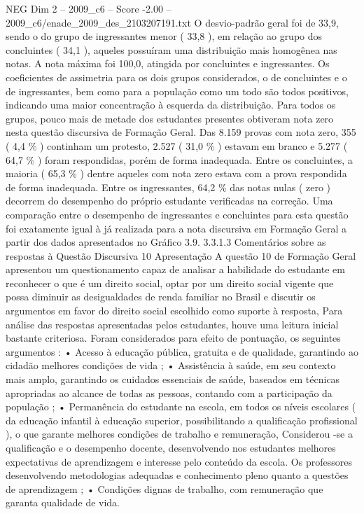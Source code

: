 \begin{textsample}{NEG Dim 2 – 2009\_c6 – Score -2.00 – 2009\_c6/enade\_2009\_des\_2103207191.txt}
O desvio-padrão geral foi de 33,9, sendo o do grupo de ingressantes menor ( 33,8 ), em relação ao grupo dos concluintes ( 34,1 ), aqueles possuíram uma distribuição mais homogênea nas notas.
A nota máxima foi 100,0, atingida por concluintes e ingressantes.
Os coeficientes de assimetria para os dois grupos considerados, o de concluintes e o de ingressantes, bem como para a população como um todo são todos positivos, indicando uma maior concentração à esquerda da distribuição.
Para todos os grupos, pouco mais de metade dos estudantes presentes obtiveram nota zero nesta questão discursiva de Formação Geral.
Das 8.159 provas com nota zero, 355 ( 4,4 \% ) continham um protesto, 2.527 ( 31,0 \% ) estavam em branco e 5.277 ( 64,7 \% ) foram respondidas, porém de forma inadequada.
Entre os concluintes, a maioria ( 65,3 \% ) dentre aqueles com nota zero estava com a prova respondida de forma inadequada.
Entre os ingressantes, 64,2 \% das notas nulas ( zero ) decorrem do desempenho do próprio estudante verificadas na correção.
Uma comparação entre o desempenho de ingressantes e concluintes para esta questão foi exatamente igual à já realizada para a nota discursiva em Formação Geral a partir dos dados apresentados no Gráfico 3.9. 3.3.1.3 Comentários sobre as respostas à Questão Discursiva 10 Apresentação A questão 10 de Formação Geral apresentou um questionamento capaz de analisar a habilidade do estudante em reconhecer o que é um direito social, optar por um direito social vigente que possa diminuir as desigualdades de renda familiar no Brasil e discutir os argumentos em favor do direito social escolhido como suporte à resposta, Para análise das respostas apresentadas pelos estudantes, houve uma leitura inicial bastante criteriosa.
Foram considerados para efeito de pontuação, os seguintes argumentos : • Acesso à educação pública, gratuita e de qualidade, garantindo ao cidadão melhores condições de vida ; • Assistência à saúde, em seu contexto mais amplo, garantindo os cuidados essenciais de saúde, baseados em técnicas apropriadas ao alcance de todas as pessoas, contando com a participação da população ; • Permanência do estudante na escola, em todos os níveis escolares ( da educação infantil à educação superior, possibilitando a qualificação profissional ), o que garante melhores condições de trabalho e remuneração, Considerou -se a qualificação e o desempenho docente, desenvolvendo nos estudantes melhores expectativas de aprendizagem e interesse pelo conteúdo da escola.
Os professores desenvolvendo metodologias adequadas e conhecimento pleno quanto a questões de aprendizagem ; • Condições dignas de trabalho, com remuneração que garanta qualidade de vida.

\end{textsample}
